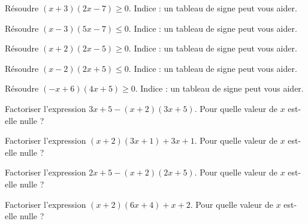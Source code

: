 
\begin{exercice}\label{exosmath-0462}

    \vspace{2cm}

    Résoudre \( (x+3)(2x-7)\geq 0\). Indice : un tableau de signe peut vous aider.
    \vspace{2cm}

    Résoudre \( (x-3)(5x-7)\leq 0\). Indice : un tableau de signe peut vous aider.
    \vspace{2cm}

    Résoudre \( (x+2)(2x-5)\geq 0\). Indice : un tableau de signe peut vous aider.
    \vspace{2cm}

    Résoudre \( (x-2)(2x+5)\leq 0\). Indice : un tableau de signe peut vous aider.
    \vspace{2cm}

    Résoudre \( (-x+6)(4x+5)\geq 0\). Indice : un tableau de signe peut vous aider.
    \vspace{2cm}

    Factoriser l'expression \( 3x+5-(x+2)(3x+5)\). Pour quelle valeur de \( x\) est-elle nulle ?
    \vspace{2cm}

    Factoriser l'expression \( (x+2)(3x+1)+3x+1\). Pour quelle valeur de \( x\) est-elle nulle ?
    \vspace{2cm}

    Factoriser l'expression \( 2x+5-(x+2)(2x+5)\). Pour quelle valeur de \( x\) est-elle nulle ?
    \vspace{2cm}

    Factoriser l'expression \( (x+2)(6x+4)+x+2\). Pour quelle valeur de \( x\) est-elle nulle ?
    \vspace{2cm}

\end{exercice}
